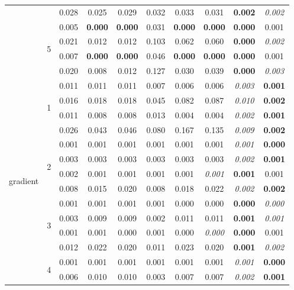 \documentclass[authoryear, review, 11pt]{elsarticle}
\begin{document}
\begin{table}
\begin{center}
{\begin{tabular}{cccccccccc}
   &  & 0.028 & 0.025 & 0.029 & 0.032 & 0.033 & 0.031 & \textbf{0.002} & \emph{0.002} \\ 
  \cline{3-10}
   & \multirow{4}{*}{5} & 0.005 & \textbf{0.000} & \textbf{0.000} & 0.031 & \textbf{0.000} & \textbf{0.000} & \textbf{0.000} & 0.001 \\ 
   &  & 0.021 & 0.012 & 0.012 & 0.103 & 0.062 & 0.060 & \textbf{0.000} & \emph{0.002} \\ 
   &  & 0.007 & \textbf{0.000} & \textbf{0.000} & 0.046 & \textbf{0.000} & \textbf{0.000} & \textbf{0.000} & 0.001 \\ 
   &  & 0.020 & 0.008 & 0.012 & 0.127 & 0.030 & 0.039 & \textbf{0.000} & \emph{0.003} \\ 
  \hline
  \multirow{20}{*}{gradient} & \multirow{4}{*}{1} & 0.011 & 0.011 & 0.011 & 0.007 & 0.006 & 0.006 & \emph{0.003} & \textbf{0.001} \\ 
   &  & 0.016 & 0.018 & 0.018 & 0.045 & 0.082 & 0.087 & \emph{0.010} & \textbf{0.002} \\ 
   &  & 0.011 & 0.008 & 0.008 & 0.013 & 0.004 & 0.004 & \emph{0.002} & \textbf{0.001} \\ 
   &  & 0.026 & 0.043 & 0.046 & 0.080 & 0.167 & 0.135 & \emph{0.009} & \textbf{0.002} \\ 
  \cline{3-10}
   & \multirow{4}{*}{2} & 0.001 & 0.001 & 0.001 & 0.001 & 0.001 & 0.001 & \emph{0.001} & \textbf{0.000} \\ 
   &  & 0.003 & 0.003 & 0.003 & 0.003 & 0.003 & 0.003 & \emph{0.002} & \textbf{0.001} \\ 
   &  & 0.002 & 0.001 & 0.001 & 0.001 & 0.001 & \emph{0.001} & \textbf{0.001} & 0.001 \\ 
   &  & 0.008 & 0.015 & 0.020 & 0.008 & 0.018 & 0.022 & \emph{0.002} & \textbf{0.002} \\ 
  \cline{3-10}
   & \multirow{4}{*}{3} & 0.001 & 0.001 & 0.001 & 0.001 & 0.000 & 0.000 & \textbf{0.000} & \emph{0.000} \\ 
   &  & 0.003 & 0.009 & 0.009 & 0.002 & 0.011 & 0.011 & \textbf{0.001} & \emph{0.001} \\ 
   &  & 0.001 & 0.001 & 0.000 & 0.001 & 0.000 & \emph{0.000} & \textbf{0.000} & 0.001 \\ 
   &  & 0.012 & 0.022 & 0.020 & 0.011 & 0.023 & 0.020 & \textbf{0.001} & \emph{0.002} \\ 
  \cline{3-10}
   & \multirow{4}{*}{4} & 0.001 & 0.001 & 0.001 & 0.001 & 0.001 & 0.001 & \emph{0.001} & \textbf{0.000} \\ 
   &  & 0.006 & 0.010 & 0.010 & 0.003 & 0.007 & 0.007 & \emph{0.002} & \textbf{0.001} \\ 

\end{tabular}}
\end{center}
\end{table}
\end{document}
